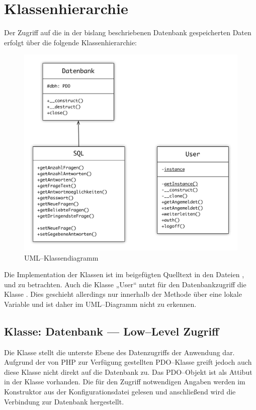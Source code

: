 \section{Klassenhierarchie}
\label{sec:klassen}
Der Zugriff auf die in der bislang beschriebenen Datenbank gespeicherten Daten erfolgt über die folgende  Klassenhierarchie:

\begin{figure}[H]
\begin{center}
\includegraphics[width=\textwidth]{UML.jpg}
\caption{UML--Klassendiagramm}
\label{fig:uml}
\end{center}
\end{figure}

Die Implementation der Klassen ist im beigefügten Quelltext in den Dateien ,  und  zu betrachten. Auch die Klasse „User“ nutzt für den Datenbankzugriff die Klasse . Dies geschieht allerdings nur innerhalb der Methode  über eine lokale Variable und ist daher im UML--Diagramm nicht zu erkennen.

\subsection{Klasse: Datenbank --- Low--Level Zugriff}

Die Klasse  stellt die unterste Ebene des Datenzugriffs der Anwendung dar. Aufgrund der von PHP zur Verfügung gestellten PDO--Klasse greift jedoch auch diese Klasse nicht direkt auf die Datenbank  zu. Das PDO--Objekt ist als Attibut in der Klasse vorhanden. Die für den Zugriff notwendigen Angaben werden im Konstruktor aus der Konfigurationsdatei  gelesen und anschließend wird die Verbindung zur Datenbank hergestellt. 

